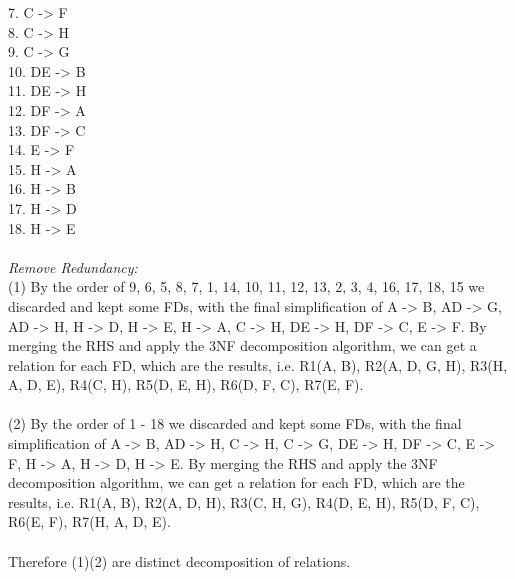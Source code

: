 \documentclass[12pt]{article}
\begin{document}
7. C ->  F\\
8. C ->  H\\
9. C ->  G\\ 
10. DE ->  B\\
11. DE ->  H\\
12. DF ->  A\\
13. DF ->  C\\
14. E ->  F\\
15. H ->  A\\
16. H ->  B\\
17. H ->  D\\
18. H ->  E\\
\\
\textit{Remove Redundancy:}\\
(1) By the order of 9, 6, 5, 8, 7, 1, 14, 10, 11, 12, 13, 2, 3, 4, 16, 17, 18, 15 we discarded and kept some FDs, with the final simplification of {A -> B, AD ->  G, AD ->  H, H ->  D, H ->  E, H ->  A, C ->  H, DE ->  H, DF ->  C, E ->  F}. By merging the RHS and apply the 3NF decomposition algorithm, we can get a relation for each FD, which are the results, i.e. R1(A, B), R2(A, D, G, H), R3(H, A, D, E), R4(C, H), R5(D, E, H), R6(D, F, C), R7(E, F).\\
\\
(2) By the order of 1 - 18 we discarded and kept some FDs, with the final simplification of {A -> B, AD ->  H, C ->  H, C ->  G, DE ->  H, DF ->  C, E ->  F, H ->  A, H ->  D, H ->  E}. By merging the RHS and apply the 3NF decomposition algorithm, we can get a relation for each FD, which are the results, i.e. R1(A, B), R2(A, D, H), R3(C, H, G), R4(D, E, H), R5(D, F, C), R6(E, F), R7(H, A, D, E).\\
\\
Therefore (1)(2) are distinct decomposition of relations.
\end{document}
